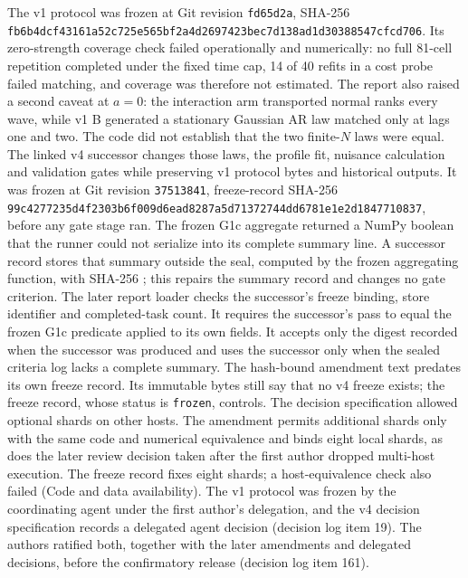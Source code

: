 The v1 protocol was frozen at Git revision \texttt{fd65d2a}, SHA-256 \texttt{fb6b4dcf4316}\allowbreak\texttt{1a52c725e565}\allowbreak\texttt{bf2a4d269742}\allowbreak\texttt{3bec7d138ad1}\allowbreak\texttt{d30388547cfc}\allowbreak\texttt{d706}. %
Its zero-strength coverage check failed operationally and numerically: no full 81-cell repetition completed under the fixed time cap, 14 of 40 refits in a cost probe failed matching, and coverage was therefore not estimated. %
The report also raised a second caveat at $a=0$: the interaction arm transported normal ranks every wave, while v1 B generated a stationary Gaussian AR law matched only at lags one and two. The code did not establish that the two finite-$N$ laws were equal. %
The linked v4 successor changes those laws, the profile fit, nuisance calculation and validation gates while preserving v1 protocol bytes and historical outputs. %
It was frozen at Git revision \texttt{37513841}, freeze-record SHA-256 \texttt{99c4277235d4}\allowbreak\texttt{f2303b6f009d}\allowbreak\texttt{6ead8287a5d7}\allowbreak\texttt{1372744dd678}\allowbreak\texttt{1e1e2d184771}\allowbreak\texttt{0837}, before any gate stage ran. %
The frozen G1c aggregate returned a NumPy boolean that the runner could not serialize into its complete summary line. %
A successor record stores that summary outside the seal, computed by the frozen aggregating function, with SHA-256 \allowbreak{}\allowbreak{}\allowbreak{}\allowbreak{}\allowbreak{}\allowbreak{}\allowbreak{}; this repairs the summary record and changes no gate criterion. %
The later report loader checks the successor's freeze binding, store identifier and completed-task count. It requires the successor's pass to equal the frozen G1c predicate applied to its own fields. It accepts only the digest recorded when the successor was produced and uses the successor only when the sealed criteria log lacks a complete summary. %
The hash-bound amendment text predates its own freeze record. Its immutable bytes still say that no v4 freeze exists; the freeze record, whose status is \texttt{frozen}, controls. %
The decision specification allowed optional shards on other hosts. The amendment permits additional shards only with the same code and numerical equivalence and binds eight local shards, as does the later review decision taken after the first author dropped multi-host execution. The freeze record fixes eight shards; a host-equivalence check also failed (Code and data availability). %
The v1 protocol was frozen by the coordinating agent under the first author's delegation, and the v4 decision specification records a delegated agent decision (decision log item 19). The authors ratified both, together with the later amendments and delegated decisions, before the confirmatory release (decision log item 161). %

